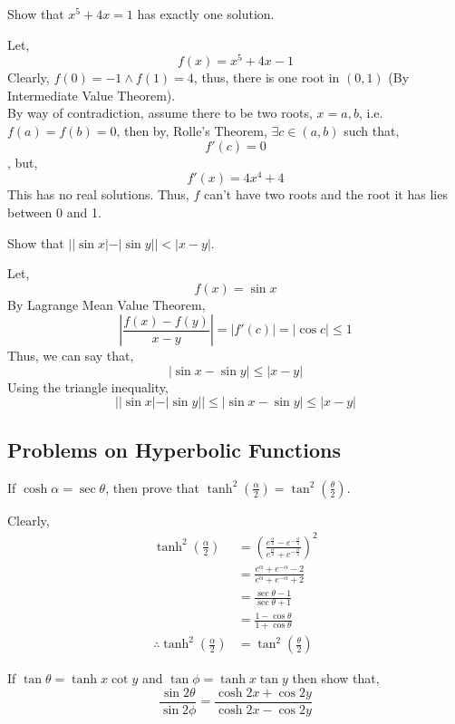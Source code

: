 \begin{asign}
	Show that $x^5+4x=1$ has exactly one solution.
\end{asign}
\begin{anse}
	Let,
	\[f(x)=x^5+4x-1\]
	Clearly, $f(0)=-1 \land f(1)=4$, thus, there is one root in $(0,1)$ (By Intermediate Value Theorem).\\
	By way of contradiction, assume there to be two roots, $x=a,b$, i.e. $f(a)=f(b)=0$, then by, Rolle's Theorem, $\exists c\in (a,b)$ such that,
	\[f'(c)=0\], but,
	\[f'(x)=4x^4+4\]
	This has no real solutions. Thus, $f$ can't have two roots and the root it has lies between 0 and 1.
\end{anse}
\begin{asign}
	Show that $||\sin x|-|\sin y||< |x-y|$.
\end{asign}
\begin{anse}
	Let,
	\[f(x)=\sin x\]
	By Lagrange Mean Value Theorem,
	\[|\frac{f(x)-f(y)}{x-y}|=|f'(c)|=|\cos c|\leq 1\]
	Thus, we can say that,
	\[|\sin x-\sin y|\leq |x-y|\]
	Using the triangle inequality,
	\[||\sin x|-|\sin y||\leq |\sin x-\sin y|\leq |x-y|\]
\end{anse}
\subsection{Problems on Hyperbolic Functions}
\begin{asign}
	If $\cosh \alpha=\sec\theta$, then prove that $\tanh^2(\frac{\alpha}{2})=\tan^2(\frac{\theta}{2})$.
\end{asign}
\begin{anse}
	Clearly,
	\[\begin{split}
		\tanh^2\left(\frac{\alpha}{2}\right)&=\left(\frac{e^{\frac{\alpha}{2}}-e^{-\frac{\alpha}{2}}}{e^\frac{\alpha}{2}+e^{-\frac{\alpha}{2}}}\right)^2\\
		&=\frac{e^\alpha+e^{-\alpha}-2}{e^\alpha+e^{-\alpha}+2}\\
		&=\frac{\sec\theta-1}{\sec\theta+1}\\
		&=\frac{1-\cos\theta}{1+\cos\theta}\\
		\therefore 	\tanh^2\left(\frac{\alpha}{2}\right)&=\tan^2(\frac{\theta}{2})
	\end{split}\]
\end{anse}
\begin{asign}
	If $\tan\theta=\tanh x\cot y$ and $\tan\phi=\tanh x\tan y$ then show that,
	\[\frac{\sin2\theta}{\sin2\phi}=\frac{\cosh2x+\cos2y}{\cosh2x-\cos2y}\]
\end{asign}

